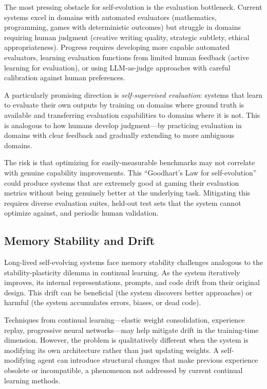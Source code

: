 \documentclass[11pt,a4paper]{article}
\begin{document}
The most pressing obstacle for self-evolution is the evaluation bottleneck. Current systems excel in domains with automated evaluators (mathematics, programming, games with deterministic outcomes) but struggle in domains requiring human judgment (creative writing quality, strategic subtlety, ethical appropriateness). Progress requires developing more capable automated evaluators, learning evaluation functions from limited human feedback (active learning for evaluation), or using LLM-as-judge approaches with careful calibration against human preferences.

A particularly promising direction is \emph{self-supervised evaluation}: systems that learn to evaluate their own outputs by training on domains where ground truth is available and transferring evaluation capabilities to domains where it is not. This is analogous to how humans develop judgment---by practicing evaluation in domains with clear feedback and gradually extending to more ambiguous domains.

The risk is that optimizing for easily-measurable benchmarks may not correlate with genuine capability improvements. This ``Goodhart's Law for self-evolution'' could produce systems that are extremely good at gaming their evaluation metrics without being genuinely better at the underlying task. Mitigating this requires diverse evaluation suites, held-out test sets that the system cannot optimize against, and periodic human validation.

\subsection{Memory Stability and Drift}

Long-lived self-evolving systems face memory stability challenges analogous to the stability-plasticity dilemma in continual learning. As the system iteratively improves, its internal representations, prompts, and code drift from their original design. This drift can be beneficial (the system discovers better approaches) or harmful (the system accumulates errors, biases, or dead code).

Techniques from continual learning---elastic weight consolidation, experience replay, progressive neural networks---may help mitigate drift in the training-time dimension. However, the problem is qualitatively different when the system is modifying its own architecture rather than just updating weights. A self-modifying agent can introduce structural changes that make previous experience obsolete or incompatible, a phenomenon not addressed by current continual learning methods.
\end{document}
